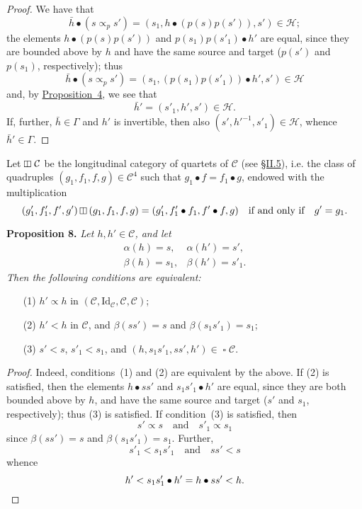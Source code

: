 \documentclass[a4paper,oneside,nobib,nofonts,notitlepage,notoc,nols,fleqn,justified]{tufte-book}
\newenvironment{itenv}[1]
  {\phantomsection\par\medskip\noindent\textbf{#1.}\itshape}
  {\par\medskip}
\newcommand{\oldpage}[1]{{\reversemarginpar\marginnote{\raggedleft\footnotesize\textit{p.~#1}}}}
\newcommand{\CC}{\mathcal{C}}
\newcommand{\HH}{\mathcal{H}}
\newcommand{\subs}{\mathrel{\propto}}
\newcommand{\Id}{\mathrm{Id}}
\DeclareMathOperator{\sq}{\square}
\DeclareMathOperator{\vsq}{\raisebox{-.1em}{\rotatebox{90}{$\boxminus$}\,}}
\newcommand{\vmult}{\mathbin{\raisebox{-.1em}{\rotatebox{90}{$\boxminus$}}}}
\begin{document}
\begin{proof}
  We have that
  \[
    \bar{h}\bullet(s\subs_p s')
    = (s_1,h\bullet(p(s)p(s')),s')
    \in\HH;
  \]
  the elements $h\bullet(p(s)p(s'))$ and $p(s_1)p(s'_1)\bullet h'$ are equal, since they are bounded above by $h$ and have the same source and target ($p(s')$ and $p(s_1)$, respectively);
  thus
  \[
    \bar{h}\bullet(s\subs_p s')
    = (s_1,(p(s_1)p(s'_1))\bullet h',s')
    \in\HH
  \]
  and, by \hyperref[proposition:4]{Proposition~4}, we see that
  \[
    \bar{h}'
    = (s'_1,h',s')
    \in\HH.
  \]
  \oldpage{365}
  If, further, $\bar{h}\in\Gamma$ and $h'$ is invertible, then also $(s',h'^{-1},s'_1)\in\HH$, whence $\bar{h}'\in\Gamma$.
\end{proof}

Let $\vsq\CC$ be the longitudinal category of quartets of $\CC$ (see \hyperref[section:ii.5]{§II.5}), i.e. the class of quadruples $(g_1,f_1,f,g)\in\CC^4$ such that $g_1\bullet f=f_1\bullet g$, endowed with the multiplication
\[
  (g'_1,f'_1,f',g')\vmult(g_1,f_1,f,g)
  = (g'_1,f'_1\bullet f_1,f'\bullet f,g)
  \quad\text{if and only if}\quad
  g'=g_1.
\]

\begin{itenv}{Proposition 8}
\label{proposition:8}
  Let $h,h'\in\CC$, and let
  \[
    \begin{array}{ll}
      \alpha(h)
      = s,
      &\alpha(h')
      = s',
    \\\beta(h)
      = s_1,
      &\beta(h')
      = s'_1.
    \end{array}
  \]
  Then the following conditions are equivalent:
  \begin{enumerate}
    \item[\normalfont(1)]
      $h'\subs h$ in $(\CC,\Id_\CC,\CC,\CC)$;
    \item[\normalfont(2)]
      $h'<h$ in $\CC$, and $\beta(ss')=s$ and $\beta(s_1s'_1)=s_1$;
    \item[\normalfont(3)]
      $s'<s$, $s'_1<s_1$, and $(h,s_1s'_1,ss',h')\in\sq\CC$.
  \end{enumerate}
\end{itenv}

\begin{proof}
  Indeed, conditions~(1) and (2) are equivalent by the above.
  If (2) is satisfied, then the elements $h\bullet ss'$ and $s_1s'_1\bullet h'$ are equal, since they are both bounded above by $h$, and have the same source and target ($s'$ and $s_1$, respectively);
  thus (3) is satisfied.
  If condition~(3) is satisfied, then
  \[
    s'\subs s
    \quad\text{and}\quad
    s'_1\subs s_1
  \]
  since $\beta(ss')=s$ and $\beta(s_1s'_1)=s_1$.
  Further,
  \[
    s'_1<s_1s'_1
    \quad\text{and}\quad
    ss'<s
  \]
  whence
  \[
    h'
    < s_1s'_1\bullet h'
    = h\bullet ss'
    < h.
    \qedhere
  \]
\end{proof}
\end{document}
